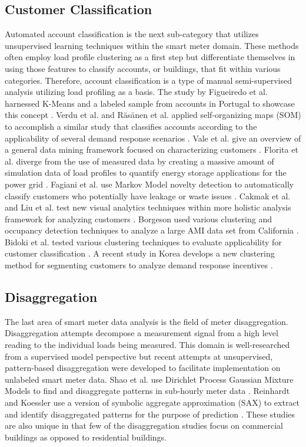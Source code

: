 \documentclass[preprint,12pt,3p]{elsarticle}
\begin{document}
\subsection{Customer Classification}
Automated account classification is the next sub-category that utilizes unsupervised learning techniques within the smart meter domain. These methods often employ load profile clustering as a first step but differentiate themselves in using those features to classify accounts, or buildings, that fit within various categories. Therefore, account classification is a type of manual semi-supervised analysis utilizing load profiling as a basis. The study by Figueiredo et al. harnessed K-Means and a labeled sample from accounts in Portugal to showcase this concept \cite{figueiredo_electric_2005}. Verdu et al. and R\"as\"anen et al. applied self-organizing maps (SOM) to accomplish a similar study that classifies accounts according to the applicability of several demand response scenarios \cite{verdu_classification_2006,rasanen_reducing_2008}. Vale et al. give an overview of a general data mining framework focused on characterizing customers \cite{vale_data_2009}. Florita et al. diverge from the use of measured data by creating a massive amount of simulation data of load profiles to quantify energy storage applications for the power grid \cite{florita_classification_2012}. Fagiani et al. use Markov Model novelty detection to automatically classify customers who potentially have leakage or waste issues \cite{fagiani_novelty_2015}. Cakmak et al. and Liu et al. test new visual analytics techniques within more holistic analysis framework for analyzing customers \cite{cakmak_new_2014,liu_smas:_2015}. Borgeson used various clustering and occupancy detection techniques to analyze a large AMI data set from California \cite{borgeson_targeted_2013}. Bidoki et al. tested various clustering techniques to evaluate applicability for customer classification \cite{bidoki_evaluating_2010}. A recent study in Korea develops a new clustering method for segmenting customers to analyze demand response incentives \cite{jang_variability_2016}.

\subsection{Disaggregation}
The last area of smart meter data analysis is the field of meter disaggregation. Disaggregation attempts decompose a measurement signal from a high level reading to the individual loads being measured. This domain is well-researched from a supervised model perspective but recent attempts at unsupervised, pattern-based disaggregation were developed to facilitate implementation on unlabeled smart meter data. Shao et al. use Dirichlet Process Gaussian Mixture Models to find and disaggregate patterns in sub-hourly meter data \cite{shao_temporal_2013}. Reinhardt and Koessler use a version of symbolic aggregate approximation (SAX) to extract and identify disaggregated patterns for the purpose of prediction \cite{reinhardt_powersax:_2014}. These studies are also unique in that few of the disaggregation studies focus on commercial buildings as opposed to residential buildings.
\end{document}
